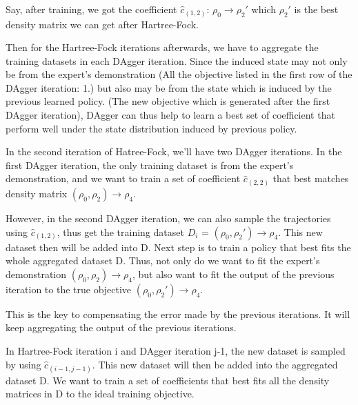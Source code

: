 \documentclass[twoside]{article}
\begin{document}
Say, after training, we got the coefficient $\hat{c}_{(1,2)}$: $\rho_0 \rightarrow \rho_{2}'$ which $\rho_2'$ is the best density matrix we can get after Hartree-Fock.

Then for the Hartree-Fock iterations afterwards, we have to aggregate the training datasets in each DAgger iteration. Since the induced state may not only be from the expert's demonstration (All the objective listed in the first row of the DAgger iteration: 1.) but also
 may be from the state which is induced by the previous learned policy. (The new objective which is generated after the first DAgger iteration), DAgger can thus help to learn a best set of coefficient that perform well under the state distribution induced by previous policy.

In the second iteration of Hatree-Fock, we'll have two DAgger iterations. In the first DAgger iteration, the only training dataset is from the expert's demonstration, and we want to train a set of coefficient  $\hat{c}_{(2,2)}$ that best matches density matrix $(\rho_0,\rho_2) \rightarrow \rho_4$.

However, in the second DAgger iteration, we can also sample the trajectories using $\hat{c}_{(1,2)}$, thus get the training dataset $D_i$ = $(\rho_0, \rho_2') \rightarrow \rho_4$. This new dataset then will be added into D.
Next step is to train a policy that best fits the whole aggregated dataset D. Thus, not only do we want to fit the expert's demonstration $(\rho_0, \rho_2) \rightarrow \rho_4$, but also want to fit the output of the previous iteration to the true objective $ (\rho_0,\rho_{2}') \rightarrow \rho_4$. 


This is the key to compensating the error made by the previous iterations. It will keep aggregating the output of the previous iterations.





In Hartree-Fock iteration i and DAgger iteration j-1, the new dataset
is sampled by using $\hat{c}_{(i-1,j-1)}$. This new dataset will then be added into the aggregated dataset D. We want to train a set of coefficients that best fits all the density matrices in D to the ideal training objective.
\end{document}
